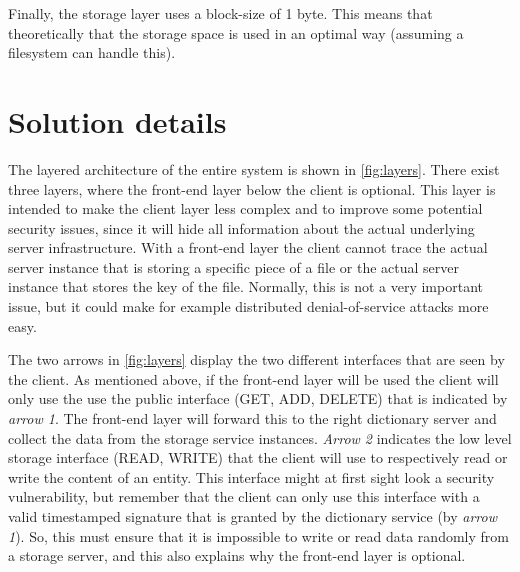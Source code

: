 \documentclass[12pt,a4paper]{scrartcl}
\begin{document}
Finally, the storage layer uses a block-size of 1 byte. This means that theoretically that the storage space is used in an optimal way (assuming a filesystem can handle this).

\section{Solution details}
The layered architecture of the entire system is shown in \autoref{fig:layers}. There exist three layers, where the front-end layer below the client is optional. This layer is intended to make the client layer less complex and to improve some potential security issues, since it will hide all information about the actual underlying server infrastructure. With a front-end layer the client cannot trace the actual server instance that is storing a specific piece of a file or the actual server instance that stores the key of the file. Normally, this is not a very important issue, but it could make for example distributed denial-of-service attacks more easy.

The two arrows in \autoref{fig:layers} display the two different interfaces that are seen by the client. As mentioned above, if the front-end layer will be used the client will only use the use the public interface (GET, ADD, DELETE) that is indicated by \emph{arrow 1}. The front-end layer will forward this to the right dictionary server and collect the data from the storage service instances. \emph{Arrow 2} indicates the low level storage interface (READ, WRITE) that the client will use to respectively read or write the content of an entity. This interface might at first sight look a security vulnerability, but remember that the client can only use this interface with a valid timestamped signature that is granted by the dictionary service (by \emph{arrow 1}). So, this must ensure that it is impossible to write or read data randomly from a storage server, and this also explains why the front-end layer is optional.
\end{document}
